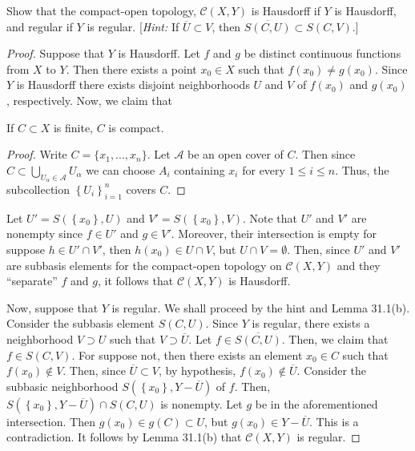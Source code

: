 \begin{problem}[Munkres \S 46, Ex.\,6]
Show that the compact-open topology, $\mathcal{C}(X,Y)$ is
Hausdorff if $Y$ is Hausdorff, and regular if $Y$ is
regular. [\emph{Hint:} If $\overline U\subset V$, then
$\overline{S(C,U)}\subset S(C,V)$.]
\end{problem}
\begin{proof}
Suppose that $Y$ is Hausdorff. Let $f$ and $g$ be distinct
continuous functions from $X$ to $Y$. Then there exists a point
$x_0\in X$ such that $f(x_0)\neq g(x_0)$. Since $Y$ is Hausdorff
there exists disjoint neighborhoods $U$ and $V$ of $f(x_0)$ and
$g(x_0)$, respectively. Now, we claim that
\begin{claim*}
If $C\subset X$ is finite, $C$ is compact.
\end{claim*}
\begin{proof}
\renewcommand\qedsymbol{$\clubsuit$}
Write $C=\{x_1,...,x_n\}$. Let $\mathcal{A}$ be an open cover of
$C$. Then since $C\subset\bigcup_{U_\alpha\in\mathcal{A}}
U_\alpha$ we can choose $A_i$ containing $x_i$ for every $1\leq
i\leq n$. Thus, the subcollection $\left\{U_i\right\}_{i=1}^n$
covers $C$.
\end{proof}
Let $U'=S\left(\left\{x_0\right\},U\right)$ and
$V'=S\left(\left\{x_0\right\},V\right)$. Note that $U'$ and $V'$
are nonempty since $f\in U'$ and $g\in V'$. Moreover, their
intersection is empty for suppose $h\in U'\cap V'$, then
$h(x_0)\in U\cap V$, but $U\cap V=\emptyset$. Then, since $U'$
and $V'$ are subbasis elements for the compact-open topology on
$\mathcal{C}(X,Y)$ and they ``separate'' $f$ and $g$, it follows
that $\mathcal{C}(X,Y)$ is Hausdorff.

Now, suppose that $Y$ is regular. We shall proceed by the
hint and Lemma 31.1(b). Consider the subbasis element
$S(C,U)$. Since $Y$ is regular, there exists a neighborhood
$V\supset U$ such that $V\supset\overline{U}$. Let
$f\in\overline{S(C,U)}$. Then, we claim that $f\in S(C,V)$. For
suppose not, then there exists an element $x_0\in C$ such that
$f(x_0)\notin V$. Then, since $\overline{U}\subset V$, by
hypothesis, $f(x_0)\notin\overline{U}$. Consider the subbasic
neighborhood $S\left(\left\{x_0\right\},Y-\overline{U}\right)$ of
$f$. Then, $S\left(\left\{x_0\right\},Y-\overline{U}\right)\cap
S(C,U)$ is nonempty. Let $g$ be in the aforementioned
intersection. Then $g(x_0)\in g(C)\subset U$, but $g(x_0)\in
Y-\overline{U}$. This is a contradiction. It follows by Lemma
31.1(b) that $\mathcal{C}(X,Y)$ is regular.
\end{proof}
